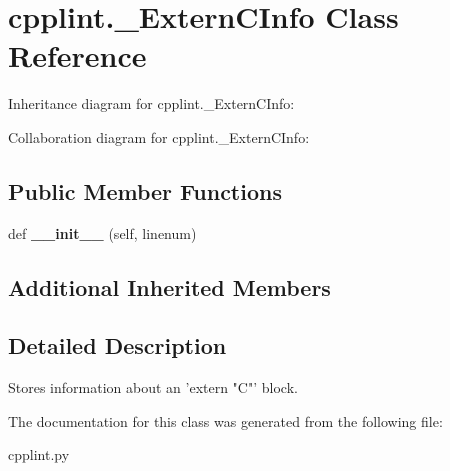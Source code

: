 \hypertarget{classcpplint_1_1__ExternCInfo}{}\section{cpplint.\+\_\+\+Extern\+C\+Info Class Reference}
\label{classcpplint_1_1__ExternCInfo}


Inheritance diagram for cpplint.\+\_\+\+Extern\+C\+Info\+:


Collaboration diagram for cpplint.\+\_\+\+Extern\+C\+Info\+:
\subsection*{Public Member Functions}
\begin{DoxyCompactItemize}
\item 
\mbox{\label{classcpplint_1_1__ExternCInfo_a903a8aefdb01fd5be044f920ea110d0a}} 
def {\bfseries \+\_\+\+\_\+init\+\_\+\+\_\+} (self, linenum)
\end{DoxyCompactItemize}
\subsection*{Additional Inherited Members}


\subsection{Detailed Description}
\begin{DoxyVerb}Stores information about an 'extern "C"' block.\end{DoxyVerb}
 

The documentation for this class was generated from the following file\+:\begin{DoxyCompactItemize}
\item 
cpplint.\+py\end{DoxyCompactItemize}
